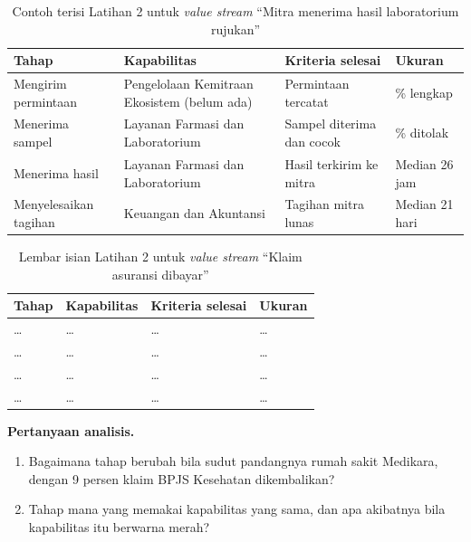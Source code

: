 \begin{table}[!htb]
  \centering
  \caption{Contoh terisi Latihan 2 untuk \textit{value stream} ``Mitra menerima hasil laboratorium rujukan''}
  \label{tab:ch05-lat2-contoh}
  \small
  \begin{tabularx}{\textwidth}{>{\raggedright\arraybackslash}p{3.2cm}>{\raggedright\arraybackslash}X>{\raggedright\arraybackslash}X>{\raggedright\arraybackslash}p{2.6cm}}
    \hline
    \textbf{Tahap} & \textbf{Kapabilitas} & \textbf{Kriteria selesai} & \textbf{Ukuran} \\
    \hline
    Mengirim permintaan & Pengelolaan Kemitraan Ekosistem (belum ada) & Permintaan tercatat & 92\% lengkap \\
    \hline
    Menerima sampel & Layanan Farmasi dan Laboratorium & Sampel diterima dan cocok & 2\% ditolak \\
    \hline
    Menerima hasil & Layanan Farmasi dan Laboratorium & Hasil terkirim ke mitra & Median 26 jam \\
    \hline
    Menyelesaikan tagihan & Keuangan dan Akuntansi & Tagihan mitra lunas & Median 21 hari \\
    \hline
  \end{tabularx}
\end{table}

\begin{table}[!htb]
  \centering
  \caption{Lembar isian Latihan 2 untuk \textit{value stream} ``Klaim asuransi dibayar''}
  \label{tab:ch05-lat2-hasil}
  \small
  \begin{tabularx}{\textwidth}{>{\raggedright\arraybackslash}p{3.2cm}>{\raggedright\arraybackslash}X>{\raggedright\arraybackslash}X>{\raggedright\arraybackslash}p{2.6cm}}
    \hline
    \textbf{Tahap} & \textbf{Kapabilitas} & \textbf{Kriteria selesai} & \textbf{Ukuran} \\
    \hline
    \dots & \dots & \dots & \dots \\
    \hline
    \dots & \dots & \dots & \dots \\
    \hline
    \dots & \dots & \dots & \dots \\
    \hline
    \dots & \dots & \dots & \dots \\
    \hline
  \end{tabularx}
\end{table}

\textbf{Pertanyaan analisis.}

\begin{enumerate}
  \item Bagaimana tahap berubah bila sudut pandangnya rumah sakit Medikara, dengan 9 persen klaim BPJS Kesehatan dikembalikan?
  \item Tahap mana yang memakai kapabilitas yang sama, dan apa akibatnya bila kapabilitas itu berwarna merah?
\end{enumerate}

